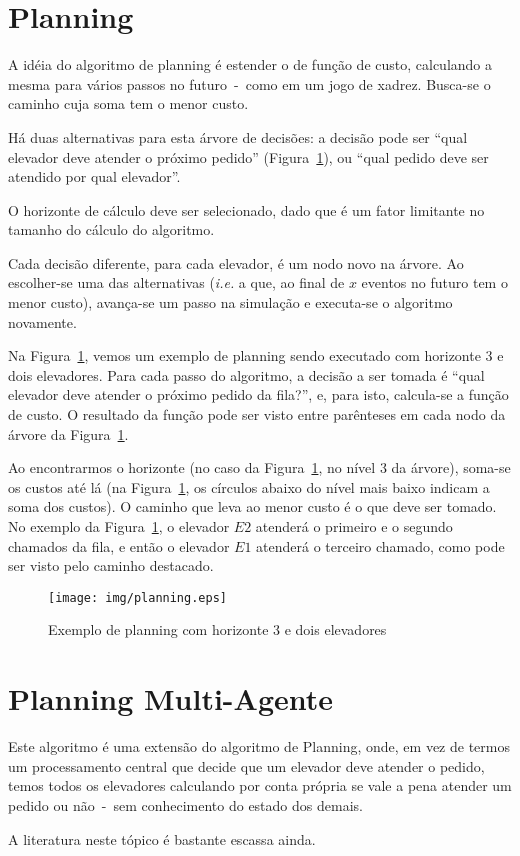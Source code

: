 \section{Planning}


A idéia do algoritmo de planning é estender o de função de custo, calculando a
mesma para vários passos no futuro~-~como em um jogo de xadrez. Busca-se o
caminho cuja soma tem o menor custo.

Há duas alternativas para esta árvore de decisões: a decisão pode ser ``qual
elevador deve atender o próximo pedido'' (Figura~\ref{fig:planning}),
ou ``qual pedido deve ser atendido por qual elevador''. %

O horizonte de cálculo deve ser selecionado, dado que é um fator limitante no
tamanho do cálculo do algoritmo.

Cada decisão diferente, para cada elevador, é um nodo novo na árvore. Ao
escolher-se uma das alternativas (\textit{i.e.} a que, ao final de $x$ eventos
no futuro tem o menor custo), avança-se um passo na simulação e executa-se o
algoritmo novamente.

Na Figura~\ref{fig:planning}, vemos um exemplo de planning sendo executado com
horizonte 3 e dois elevadores. Para cada passo do algoritmo, a decisão a ser
tomada é ``qual elevador deve atender o próximo pedido da fila?'', e, para isto,
calcula-se a função de custo. O resultado da função pode ser visto entre
parênteses em cada nodo da árvore da Figura~\ref{fig:planning}.

Ao encontrarmos o horizonte (no caso da Figura~\ref{fig:planning}, no nível 3 da
árvore), soma-se os custos até lá (na Figura~\ref{fig:planning}, os círculos
abaixo do nível mais baixo indicam a soma dos custos). O caminho que leva ao
menor custo é o que deve ser tomado. No exemplo da Figura~\ref{fig:planning}, o
elevador $E2$ atenderá o primeiro e o segundo chamados da fila, e então o
elevador $E1$ atenderá o terceiro chamado, como pode ser visto pelo caminho destacado.

\begin{figure}[htb!]
  \centering
  \texttt{[image: img/planning.eps]}
  \caption{Exemplo de planning com horizonte 3 e dois elevadores}
\label{fig:planning}
\end{figure}

\section{Planning Multi-Agente}

Este algoritmo é uma extensão do algoritmo de Planning, onde, em vez de termos
um processamento central que decide que um elevador deve atender o pedido, temos
todos os elevadores calculando por conta própria se vale a pena atender um
pedido ou não~-~sem conhecimento do estado dos demais.

A literatura neste tópico é bastante escassa ainda.